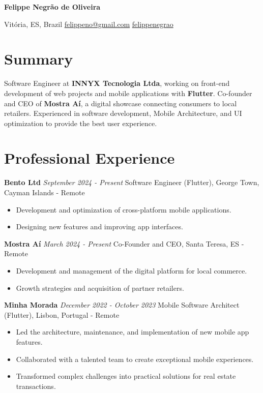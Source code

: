 \documentclass[10pt, letterpaper]{article}
\begin{document}
\begin{center}
    {\fontsize{30 pt}{30 pt} \textbf{Felippe Negr\~{a}o de Oliveira}}
    
    \vspace{0.3 cm}
    
    {Vit\'oria, ES, Brazil \quad \faEnvelope[regular] \href{mailto:felippeno@gmail.com}{felippeno@gmail.com} \quad \faLinkedin \href{https://linkedin.com/in/felippenegrao}{felippenegrao}} 
\end{center}

\section{Summary}
Software Engineer at \textbf{INNYX Tecnologia Ltda}, working on front-end development of web projects and mobile applications with \textbf{Flutter}. Co-founder and CEO of \textbf{Mostra A\'i}, a digital showcase connecting consumers to local retailers. Experienced in software development, Mobile Architecture, and UI optimization to provide the best user experience.

\section{Professional Experience}
\textbf{Bento Ltd} \hfill \textit{September 2024 - Present}\newline
Software Engineer (Flutter), George Town, Cayman Islands - Remote
\begin{itemize}
    \item Development and optimization of cross-platform mobile applications.
    \item Designing new features and improving app interfaces.
\end{itemize}

\textbf{Mostra A\'i} \hfill \textit{March 2024 - Present}\newline
Co-Founder and CEO, Santa Teresa, ES - Remote
\begin{itemize}
    \item Development and management of the digital platform for local commerce.
    \item Growth strategies and acquisition of partner retailers.
\end{itemize}

\textbf{Minha Morada} \hfill \textit{December 2022 - October 2023}\newline
Mobile Software Architect (Flutter), Lisbon, Portugal - Remote
\begin{itemize}
    \item Led the architecture, maintenance, and implementation of new mobile app features.
    \item Collaborated with a talented team to create exceptional mobile experiences.
    \item Transformed complex challenges into practical solutions for real estate transactions.
\end{itemize}
\end{document}
